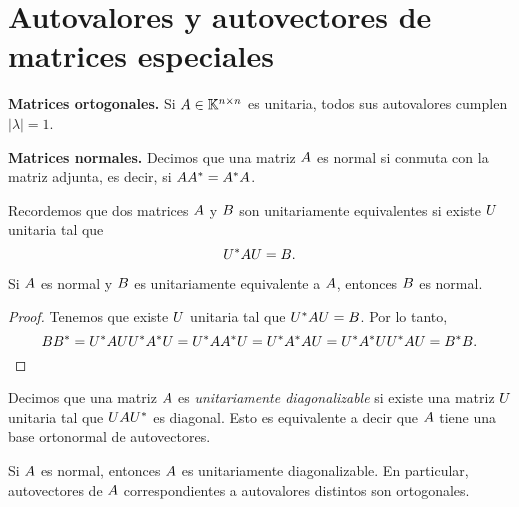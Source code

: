\section{Autovalores y autovectores de matrices especiales}

\textbf{Matrices ortogonales.} Si $\Ab \in \K^{n \times n}$ es unitaria,
    todos sus autovalores cumplen $|\lambda| = 1$.

\textbf{Matrices normales.}
Decimos que una matriz $\Ab$ es normal si conmuta con la matriz adjunta, es decir, si $\Ab \Ab^* = \Ab^* \Ab$.

Recordemos que dos matrices $\Ab$ y $\Bb$ son unitariamente equivalentes si existe $\Ub$ unitaria tal que
$$
\Ub^* \Ab \Ub = \Bb.
$$

\begin{prop}
\label{prop:normal}
Si $\Ab$ es normal y $\Bb$ es unitariamente equivalente a $\Ab$, entonces $\Bb$ es normal.
\end{prop}
\begin{proof}
Tenemos que existe $\Ub$ unitaria tal que $\Ub^* \Ab \Ub = \Bb$. Por lo tanto,
$$
\Bb \Bb^* = \Ub^* \Ab \Ub \Ub^* \Ab^* \Ub = \Ub^* \Ab \Ab^* \Ub = \Ub^* \Ab^* \Ab \Ub = \Ub^* \Ab^* \Ub \Ub^* \Ab \Ub = \Bb^* \Bb.
$$
\end{proof}

Decimos que una matriz $\Ab$ es \emph{unitariamente diagonalizable} si existe una matriz $\Ub$ unitaria tal que $\Ub \Ab \Ub^*$ es diagonal. Esto es equivalente a decir que $\Ab$ tiene una base ortonormal de autovectores.

\begin{prop}
Si $\Ab$ es normal, entonces $\Ab$ es unitariamente diagonalizable. En particular, autovectores de $\Ab$ correspondientes a autovalores distintos son ortogonales.
\end{prop}

